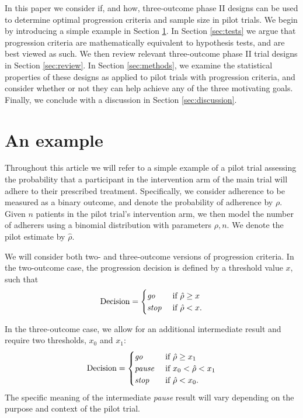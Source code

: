 \documentclass[sagev]{sagej}
\begin{document}
In this paper we consider if, and how, three-outcome phase II designs can be used to determine optimal progression criteria and sample size in pilot trials. We begin by introducing a simple example in Section \ref{sec:example}. In Section \ref{sec:tests} we argue that progression criteria are mathematically equivalent to hypothesis tests, and are best viewed as such. We then review relevant three-outcome phase II trial designs in Section \ref{sec:review}. In Section \ref{sec:methods}, we examine the statistical properties of these designs as applied to pilot trials with progression criteria, and consider whether or not they can help achieve any of the three motivating goals. Finally, we conclude with a discussion in Section \ref{sec:discussion}.

\section{An example}\label{sec:example}

Throughout this article we will refer to a simple example of a pilot trial assessing the probability that a participant in the intervention arm of the main trial will adhere to their prescribed treatment. Specifically, we consider adherence to be measured as a binary outcome, and denote the probability of adherence by $\rho$. Given  $n$ patients in the pilot trial's intervention arm, we then model the number of adherers using a binomial distribution with parameters $\rho, n$. We denote the pilot estimate by $\hat{\rho}$.

We will consider both two- and three-outcome versions of progression criteria. In the two-outcome case, the progression decision is defined by a threshold value $x$, such that
\begin{equation}\label{eqn:two_outcome}
\text{Decision} = 
\begin{cases}
\text{\emph{go}} & \text{ if } \hat{\rho} \geq x \\
\text{\emph{stop}} & \text{ if } \hat{\rho} < x. \\
\end{cases}
\end{equation}

In the three-outcome case, we allow for an additional intermediate result and require two thresholds, $x_0$ and $x_1$:
\begin{equation}\label{eqn:three_outcome}
\text{Decision} = 
\begin{cases}
\text{\emph{go}} & \text{ if } \hat{\rho} \geq x_1 \\
\text{\emph{pause}} & \text{ if } x_0 < \hat{\rho} < x_1 \\
\text{\emph{stop}} & \text{ if } \hat{\rho} < x_0. \\
\end{cases}
\end{equation}
The specific meaning of the intermediate \emph{pause} result will vary depending on the purpose and context of the pilot trial. 
\end{document}

